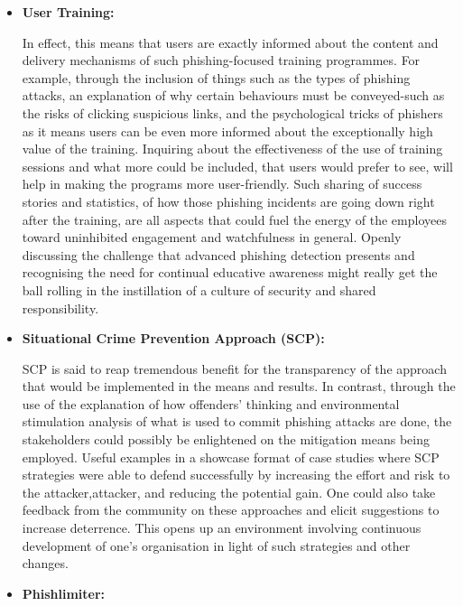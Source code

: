 \begin{itemize}
\item \textbf{User Training:}

In effect, this means that users are exactly informed about the content and delivery mechanisms of such phishing-focused training programmes. For example, through the inclusion of things such as the types of phishing attacks, an explanation of why certain behaviours must be conveyed-such as the risks of clicking suspicious links, and the psychological tricks of phishers as it means users can be even more informed about the exceptionally high value of the training. Inquiring about the effectiveness of the use of training sessions and what more could be included, that users would prefer to see, will help in making the programs more user-friendly. Such sharing of success stories and statistics, of how those phishing incidents are going down right after the training, are all aspects that could fuel the energy of the employees toward uninhibited engagement and watchfulness in general. Openly discussing the challenge that advanced phishing detection presents and recognising the need for continual educative awareness might really get the ball rolling in the instillation of a culture of security and shared responsibility.

\item \textbf{Situational Crime Prevention Approach (SCP):}

SCP is said to reap tremendous benefit for the transparency of the approach that would be implemented in the means and results. In contrast, through the use of the explanation of how offenders' thinking and environmental stimulation analysis of what is used to commit phishing attacks are done, the stakeholders could possibly be enlightened on the mitigation means being employed. Useful examples in a showcase format of case studies where SCP strategies were able to defend successfully by increasing the effort and risk to the attacker,attacker, and reducing the potential gain. One could also take feedback from the community on these approaches and elicit suggestions to increase deterrence. This opens up an environment involving continuous development of one's organisation in light of such strategies and other changes.

\item \textbf{Phishlimiter:}


\end{itemize}
